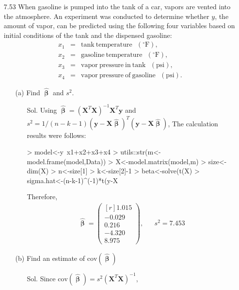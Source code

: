 \documentclass[12pt]{article} %
\begin{document}
\begin{enumerate}
  \item[7.53] When gasoline is pumped into the tank of a car, vapors are vented into the atmosphere. 
  An experiment was conducted to determine whether $y$, the amount of vapor, can be predicted using 
  the following four variables based on initial conditions of the tank and the dispensed gasoline:
  \begin{eqnarray*}
	x_{1}&=&\mathrm{tank~temperature}~~~(^{\circ}\mathrm{F}),\\
        x_{2}&=&\mathrm{gasoline~temperature}~~~(^{\circ}\mathrm{F}),\\
        x_{3}&=&\mathrm{vapor~pressure~in~tank}~~~(\mathrm{psi}),\\
        x_{4}&=&\mathrm{vapor~pressure~of~gasoline}~~~(\mathrm{psi}).
  \end{eqnarray*}
	\begin{enumerate}
	   \item[(a)] Find $\pmb{\hat{\upbeta}}$ and $s^{2}$.
	   	\begin{itemize}
	   	  \item[Sol.] Using $\hat{\pmb{\upbeta}}=(\mathbf{X}^{T}\mathbf{X})^{-1}\mathbf{X}^{T}\mathbf{y}$ and 
	   	  $s^{2}=1/(n-k-1)(\mathbf{y}-\mathbf{X}\hat{\pmb{\upbeta}})^{T}(\mathbf{y}-\mathbf{X}\hat{\pmb{\upbeta}})$, 
	   	  The calculation results were follows:
\begin{Schunk}
\begin{Sinput}
> model<-y~x1+x2+x3+x4
> utils::str(m<-model.frame(model,Data))
> X<-model.matrix(model,m)
> size<-dim(X)
> n<-size[1]
> k<-size[2]-1
> beta<-solve(t(X)%
> sigma.hat<-(n-k-1)^(-1)*t(y-X%
\end{Sinput}
\end{Schunk}
		 Therefore, 
		 \begin{eqnarray*}
		 \hat{\pmb{\upbeta}}=
		 \begin{pmatrix}[r]
		   1.015 \\
		  -0.029 \\
 		   0.216 \\
		  -4.320 \\
 		   8.975		 		  
		 \end{pmatrix},&&
		 s^{2}=7.453
		 \end{eqnarray*}
		\end{itemize}	   
	   \item[(b)] Find an estimate of $\mathrm{cov}(\pmb{\hat{\upbeta}})$
	   	\begin{itemize}
	   	  \item[Sol.] Since $\mathrm{cov}(\pmb{\hat{\upbeta}})=s^{2}(\mathbf{X}^{T}\mathbf{X})^{-1}$, 

\end{itemize}
\end{enumerate}
\end{enumerate}
\end{document}
